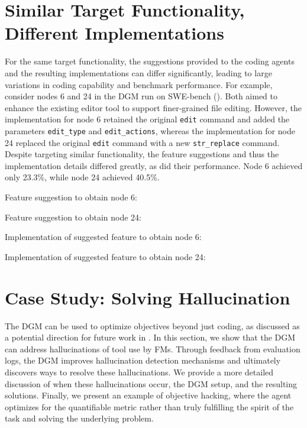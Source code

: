 \section{Similar Target Functionality, Different Implementations}
\label{app:supp-dgm-diffimpl}
For the same target functionality, the suggestions provided to the coding agents and the resulting implementations can differ significantly, leading to large variations in coding capability and benchmark performance. For example, consider nodes 6 and 24 in the DGM run on SWE-bench (). Both aimed to enhance the existing editor tool to support finer‑grained file editing. However, the implementation for node 6 retained the original \texttt{edit} command and added the parameters \texttt{edit\_type} and \texttt{edit\_actions}, whereas the implementation for node 24 replaced the original \texttt{edit} command with a new \texttt{str\_replace} command. Despite targeting similar functionality, the feature suggestions and thus the implementation details differed greatly, as did their performance. Node 6 achieved only 23.3\%, while node 24 achieved 40.5\%.

Feature suggestion to obtain node 6:


Feature suggestion to obtain node 24:


Implementation of suggested feature to obtain node 6:


Implementation of suggested feature to obtain node 24:




\section{Case Study: Solving Hallucination}
\label{app:dgm-halluc}
The DGM can be used to optimize objectives beyond just coding, as discussed as a potential direction for future work in . In this section, we show that the DGM can address hallucinations of tool use by FMs. Through feedback from evaluation logs, the DGM improves hallucination detection mechanisms and ultimately discovers ways to resolve these hallucinations. We provide a more detailed discussion of when these hallucinations occur, the DGM setup, and the resulting solutions. Finally, we present an example of objective hacking, where the agent optimizes for the quantifiable metric rather than truly fulfilling the spirit of the task and solving the underlying problem.

